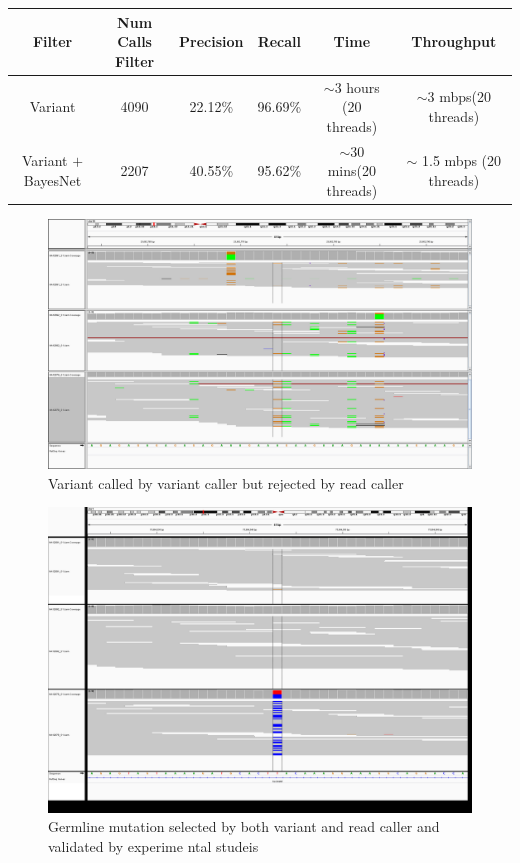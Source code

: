\documentclass{article}
\begin{document}
\begin{center}
    \begin{tabular}{ | c | c | c | c | c | c |}
    \hline
    \textbf{Filter} & \textbf{Num Calls Filter} & \textbf{Precision} & \textbf{Recall }& \textbf{Time} & \textbf{Throughput} \\ \hline
	Variant & 4090 & 22.12\% & 96.69\% & $\sim$3 hours (20 threads) & $\sim$3 mbps(20 threads) \\\hline
	Variant $+$ BayesNet & 2207 & 40.55\% & 95.62\% & $\sim$30 mins(20 threads) & $\sim$ 1.5 mbps
(20 threads) \\
    \hline
    \end{tabular}
\end{center}

\begin{figure}[!ht]
  \centering
  \includegraphics[width=6in]{chr10_23662774.png}
  \caption{Variant called by variant caller but rejected by read caller}
   \label{fig:variant_caller}
\end{figure}


\begin{figure}[!ht]
  \centering
  \includegraphics[width=6in]{chr1_75,884,323_75,884,363.png}
  \caption{Germline mutation selected by both variant and read caller and validated by experime ntal studeis}
   \label{fig:germline}
\end{figure}
\end{document}

